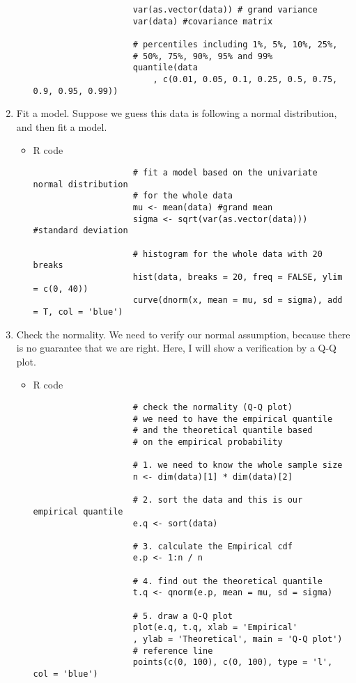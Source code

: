 \begin{enumerate}
\begin{itemize}
\begin{verbatim}
					var(as.vector(data)) # grand variance
					var(data) #covariance matrix
					
					# percentiles including 1%, 5%, 10%, 25%, 
					# 50%, 75%, 90%, 95% and 99%
					quantile(data 
						, c(0.01, 0.05, 0.1, 0.25, 0.5, 0.75, 0.9, 0.95, 0.99)) 
				\end{verbatim}
		\end{itemize}
	\item Fit a model. Suppose we guess this data is following a normal distribution, and then fit a model.
		\begin{itemize}
			\item R code
				\begin{verbatim}
					# fit a model based on the univariate normal distribution 
					# for the whole data
					mu <- mean(data) #grand mean
					sigma <- sqrt(var(as.vector(data))) #standard deviation
					
					# histogram for the whole data with 20 breaks
					hist(data, breaks = 20, freq = FALSE, ylim = c(0, 40))
					curve(dnorm(x, mean = mu, sd = sigma), add = T, col = 'blue')
				\end{verbatim}
		\end{itemize}
	\item Check the normality. We need to verify our normal assumption, because there is no guarantee that we are right. Here, I will show a verification by a Q-Q plot.
		\begin{itemize}
			\item R code
				\begin{verbatim}
					# check the normality (Q-Q plot)
					# we need to have the empirical quantile 
					# and the theoretical quantile based 
					# on the empirical probability
					
					# 1. we need to know the whole sample size
					n <- dim(data)[1] * dim(data)[2]
					
					# 2. sort the data and this is our empirical quantile
					e.q <- sort(data)
					
					# 3. calculate the Empirical cdf
					e.p <- 1:n / n
					
					# 4. find out the theoretical quantile
					t.q <- qnorm(e.p, mean = mu, sd = sigma)
					
					# 5. draw a Q-Q plot
					plot(e.q, t.q, xlab = 'Empirical'
					, ylab = 'Theoretical', main = 'Q-Q plot')
					# reference line
					points(c(0, 100), c(0, 100), type = 'l', col = 'blue') 
				\end{verbatim}
		\end{itemize}
\end{enumerate}